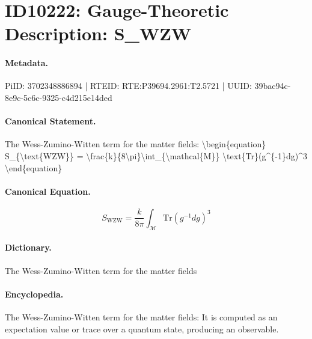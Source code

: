 \section*{ID10222: Gauge-Theoretic Description: S\_WZW}
\paragraph{Metadata.}
PiID: 3702348886894 | RTEID: RTE:P39694.2961:T2.5721 | UUID: 39bac94c-8e9c-5c6c-9325-c4d215e14ded

\paragraph{Canonical Statement.}
The Wess-Zumino-Witten term for the matter fields: \textbackslash{}begin\{equation\} S\_\{\textbackslash{}text\{WZW\}\} = \textbackslash{}frac\{k\}\{8\textbackslash{}pi\}\textbackslash{}int\_\{\textbackslash{}mathcal\{M\}\} \textbackslash{}text\{Tr\}(g\textasciicircum{}\{-1\}dg)\textasciicircum{}3 \textbackslash{}end\{equation\}

\paragraph{Canonical Equation.}
\[
S_{\text{WZW}} = \frac{k}{8\pi}\int_{\mathcal{M}} \text{Tr}(g^{-1}dg)^3
\]

\paragraph{Dictionary.}
The Wess-Zumino-Witten term for the matter fields

\paragraph{Encyclopedia.}
The Wess-Zumino-Witten term for the matter fields: It is computed as an expectation value or trace over a quantum state, producing an observable.
